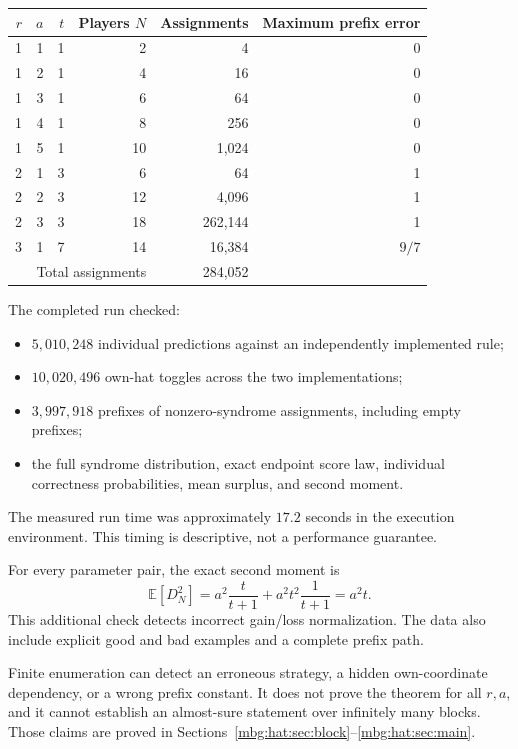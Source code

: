 \documentclass[11pt,letterpaper]{article}
\theoremstyle{definition}
\newcommand{\E}{\mathbb E}
\begin{document}
\begin{center}
\begin{tabular}{rrrrrr}
\toprule
\(r\)&\(a\)&\(t\)&Players \(N\)&Assignments&Maximum prefix error\\
\midrule
1&1&1&2&4&0\\
1&2&1&4&16&0\\
1&3&1&6&64&0\\
1&4&1&8&256&0\\
1&5&1&10&1,024&0\\
2&1&3&6&64&1\\
2&2&3&12&4,096&1\\
2&3&3&18&262,144&1\\
3&1&7&14&16,384&\(9/7\)\\
\midrule
\multicolumn{4}{r}{Total assignments}&284,052&\\
\bottomrule
\end{tabular}
\end{center}

The completed run checked:
\begin{itemize}
\item \(5{,}010{,}248\) individual predictions against an independently
implemented rule;
\item \(10{,}020{,}496\) own-hat toggles across the two implementations;
\item \(3{,}997{,}918\) prefixes of nonzero-syndrome assignments,
including empty prefixes;
\item the full syndrome distribution, exact endpoint score law,
individual correctness probabilities, mean surplus, and second moment.
\end{itemize}
The measured run time was approximately \(17.2\) seconds in the
execution environment. This timing is descriptive, not a performance
guarantee.

For every parameter pair, the exact second moment is
\[
  \E[D_N^2]
  =a^2\frac{t}{t+1}
      +a^2t^2\frac1{t+1}
  =a^2t.
\]
This additional check detects incorrect gain/loss normalization.
The data also include explicit good and bad examples and a complete
prefix path.

Finite enumeration can detect an erroneous strategy, a hidden
own-coordinate dependency, or a wrong prefix constant. It does not
prove the theorem for all \(r,a\), and it cannot establish an
almost-sure statement over infinitely many blocks. Those claims
are proved in Sections~\ref{mbg:hat:sec:block}--\ref{mbg:hat:sec:main}.
\end{document}

